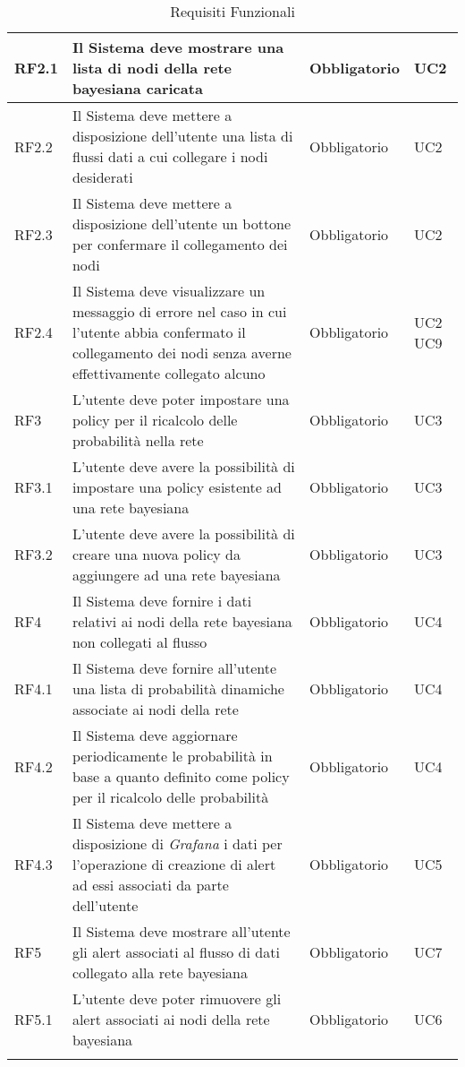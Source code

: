 \begin{center}
\begin{longtable}[c]{|m{}|m{}|m{}|m{}|}
\hline
RF2.1 & Il Sistema deve mostrare una lista di nodi della rete bayesiana caricata & Obbligatorio & UC2\\
\hline
\rowcolor{grigio}RF2.2 & Il Sistema deve mettere a disposizione dell'utente una lista di flussi dati a cui collegare i nodi desiderati & Obbligatorio & UC2\\
\hline
RF2.3 & Il Sistema deve mettere a disposizione dell'utente un bottone per confermare il collegamento dei nodi & Obbligatorio & UC2\\
\hline
\rowcolor{grigio}RF2.4 & Il Sistema deve visualizzare un messaggio di errore nel caso in cui l'utente abbia confermato il collegamento dei nodi senza averne effettivamente collegato alcuno & Obbligatorio & UC2 UC9\\
\hline
RF3 & L'utente deve poter impostare una policy per il ricalcolo delle probabilità nella rete & Obbligatorio & UC3\\
\hline
\rowcolor{grigio}RF3.1 & L'utente deve avere la possibilità di impostare una policy esistente ad una rete bayesiana  & Obbligatorio & UC3\\ 
\hline
RF3.2 & L'utente deve avere la possibilità di creare una nuova policy da aggiungere ad una rete bayesiana & Obbligatorio & UC3\\
\hline
\rowcolor{grigio}RF4 & Il Sistema deve fornire i dati relativi ai nodi della rete bayesiana non collegati al flusso & Obbligatorio & UC4\\
\hline
RF4.1 & Il Sistema deve fornire all'utente una lista di probabilità dinamiche associate ai nodi della rete & Obbligatorio & UC4\\
\hline
\rowcolor{grigio}RF4.2 & Il Sistema deve aggiornare periodicamente le probabilità in base a quanto definito come policy per il ricalcolo delle probabilità & Obbligatorio & UC4\\
\hline
RF4.3 & Il Sistema deve mettere a disposizione di \textit{Grafana} i dati per l'operazione di creazione di alert ad essi associati da parte dell'utente & Obbligatorio & UC5\\
\hline
\rowcolor{grigio}RF5 & Il Sistema deve mostrare all'utente gli alert associati al flusso di dati collegato alla rete bayesiana & Obbligatorio & UC7\\ 
\hline
RF5.1 & L'utente deve poter rimuovere gli alert associati ai nodi della rete bayesiana & Obbligatorio & UC6\\ 
\hline
\caption{Requisiti Funzionali}
\end{longtable}
\end{center}



